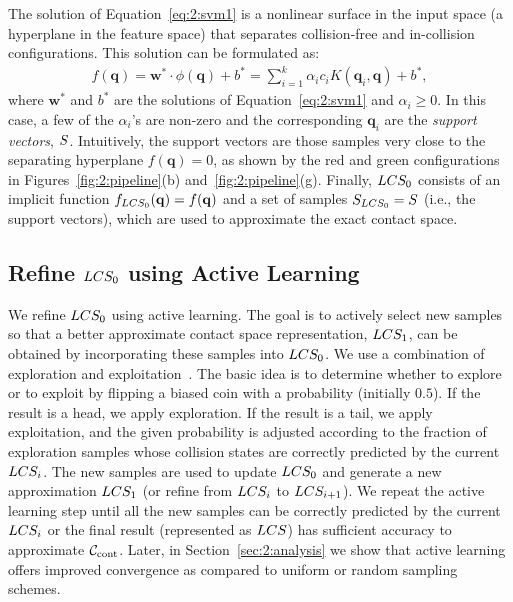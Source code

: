 The solution of Equation~\ref{eq:2:svm1} is a nonlinear surface in the
input space (a hyperplane in the feature space) that separates
collision-free and in-collision configurations. This solution can be
formulated as:
\begin{align}
\label{eq:2:svmf} f(\mathbf q) = \mathbf w^* \cdot \phi(\mathbf q) +
b^* = \sum_{i=1}^k \alpha_i c_i K(\mathbf q_i, \mathbf q) + b^*,
\end{align}
where $\mathbf w^*$ and $b^*$ are the solutions of
Equation~\ref{eq:2:svm1} and $\alpha_i \geq 0$. In this case, a few of the
$\alpha_i$'s are non-zero and the corresponding $\mathbf q_i$ are
the \emph{support vectors}, $S$. Intuitively, the support vectors
are those samples very close to the separating hyperplane
$f(\mathbf q) = 0$, as shown by the red and green configurations in
Figures~\ref{fig:2:pipeline}(b) and~\ref{fig:2:pipeline}(g).
Finally, $LCS_0$ consists of an implicit function
$f_{LCS_0}(\mathbf q) = f(\mathbf q)$ and a set of samples
$S_{LCS_0}=S$ (i.e., the support vectors), which
are used to approximate the exact contact space.


\subsection{Refine $LCS_0$ using Active Learning}
\label{sec:2:offline:activelearning}
We refine $LCS_0$ using active learning. The
goal is to actively select new samples so that a better
approximate contact space representation, $LCS_1$, can be obtained by incorporating
these samples into $LCS_0$. We use a
combination of exploration and exploitation~\cite{Huang:2010:ALQ}.
The basic idea is to determine whether to explore
or to exploit by flipping a biased coin with a probability
(initially $0.5$). If the result is a head, we apply exploration.
If the result is a tail, we apply exploitation, and the given probability  is adjusted
according to the fraction of exploration samples whose collision
states are correctly predicted by the current $LCS_i$. The new
samples are used to update $LCS_0$ and generate a new approximation
$LCS_1$ (or refine from $LCS_i$ to $LCS_{i+1}$). We repeat the active
learning step until all the new samples can be correctly
predicted by the current $LCS_i$ or the final result (represented
as $LCS$) has sufficient accuracy to approximate $\mathcal C_\text{cont}$. Later, in Section~\ref{sec:2:analysis} we show that active learning offers improved convergence as compared to uniform or random sampling schemes.


